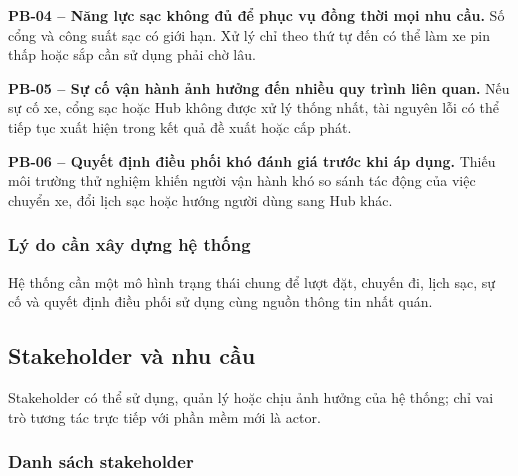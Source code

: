 \medskip
\noindent\textbf{PB-04 -- Năng lực sạc không đủ để phục vụ đồng thời mọi nhu cầu.}
Số cổng và công suất sạc có giới hạn. Xử lý chỉ theo thứ tự đến có thể làm xe pin thấp hoặc sắp cần sử dụng phải chờ lâu.

\medskip
\noindent\textbf{PB-05 -- Sự cố vận hành ảnh hưởng đến nhiều quy trình liên quan.}
Nếu sự cố xe, cổng sạc hoặc Hub không được xử lý thống nhất, tài nguyên lỗi có thể tiếp tục xuất hiện trong kết quả đề xuất hoặc cấp phát.

\medskip
\noindent\textbf{PB-06 -- Quyết định điều phối khó đánh giá trước khi áp dụng.}
Thiếu môi trường thử nghiệm khiến người vận hành khó so sánh tác động của việc chuyển xe, đổi lịch sạc hoặc hướng người dùng sang Hub khác.

\subsubsection*{Lý do cần xây dựng hệ thống}

Hệ thống cần một mô hình trạng thái chung để lượt đặt, chuyến đi, lịch sạc, sự cố và quyết định điều phối sử dụng cùng nguồn thông tin nhất quán.

\subsection{Stakeholder và nhu cầu}

Stakeholder có thể sử dụng, quản lý hoặc chịu ảnh hưởng của hệ thống; chỉ vai trò tương tác trực tiếp với phần mềm mới là actor.

\subsubsection*{Danh sách stakeholder}

